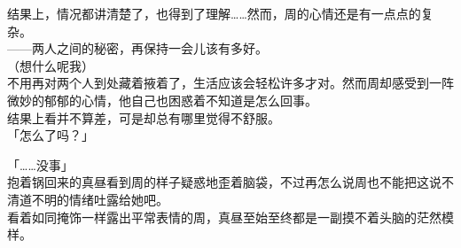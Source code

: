 结果上，情况都讲清楚了，也得到了理解……然而，周的心情还是有一点点的复杂。\\

——两人之间的秘密，再保持一会儿该有多好。\\

（想什么呢我）\\

不用再对两个人到处藏着掖着了，生活应该会轻松许多才对。然而周却感受到一阵微妙的郁郁的心情，他自己也困惑着不知道是怎么回事。\\

结果上看并不算差，可是却总有哪里觉得不舒服。\\

「怎么了吗？」

「……没事」\\

抱着锅回来的真昼看到周的样子疑惑地歪着脑袋，不过再怎么说周也不能把这说不清道不明的情绪吐露给她吧。\\

看着如同掩饰一样露出平常表情的周，真昼至始至终都是一副摸不着头脑的茫然模样。

